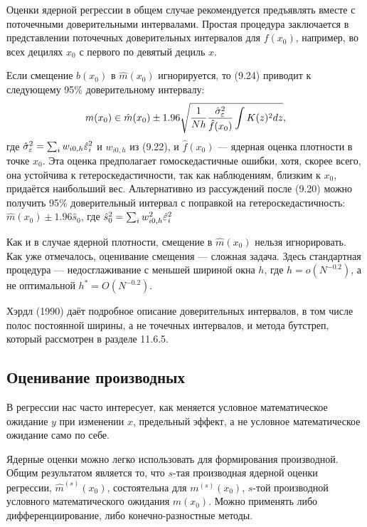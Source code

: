 Оценки ядерной регрессии в общем случае рекомендуется предъявлять вместе с поточечными доверительными интервалами. Простая процедура заключается в представлении поточечных доверительных интервалов для $f(x_0)$, например, во всех децилях $x_0$ с первого по девятый дециль $x$.

Если смещение $b(x_0)$ в $\hat{m}(x_0)$ игнорируется, то (9.24) приводит к следующему 95\% доверительному интервалу:
\[
m(x_0) \in \hat{m}(x_0) \pm 1.96 \sqrt{\frac{1}{Nh} \frac{\hat{\sigma}_{\varepsilon}^2}{\hat{f}(x_0)} \int K(z)^2dz},
\]
где $\hat{\sigma}_{\varepsilon}^2 = \sum_i w_{i0,h} \hat{\varepsilon}_i^2$ и $ w_{i0,h}$ из (9.22), и $\hat{f}(x_0)$ --- ядерная оценка плотности в точке $x_0$. Эта оценка предполагает гомоскедастичные ошибки, хотя, скорее всего, она устойчива к гетероскедастичности, так как наблюдениям, близким к $x_0$, придаётся наибольший вес. Альтернативно из рассуждений  после (9.20) можно получить 95\% доверительный интервал с поправкой на гетероскедастичность: $\hat{m}(x_0) \pm 1.96\hat{s}_0$, где $\hat{s}_0^2 = \sum_i w_{i0,h}^2 \hat{\varepsilon}_i^2$

Как и в случае ядерной плотности, смещение в $\hat{m}(x_0)$ нельзя игнорировать. Как уже отмечалось, оценивание смещения --- сложная задача. Здесь стандартная процедура --- недосглаживание с меньшей шириной окна $h$, где $h = o(N^{-0.2})$, а не оптимальной $h^* = O(N^{-0.2})$.

Хэрдл (1990) даёт подробное описание доверительных интервалов, в том числе полос постоянной ширины, а не точечных интервалов, и метода бутстреп, который рассмотрен в разделе 11.6.5.

\subsection{Оценивание производных}

В регрессии нас часто интересует, как меняется условное математическое ожидание $y$ при изменении $x$, предельный эффект, а не условное математическое ожидание само по себе.

Ядерные оценки можно легко использовать для формирования производной. Общим результатом является то, что $s$-тая
производная ядерной оценки регрессии, $\hat{m}^{(s)}(x_0)$, состоятельна для $m^{(s)}(x_0)$, $s$-той производной условного математического ожидания $m(x_0)$. Можно применять либо дифференциирование, либо конечно-разностные методы.


